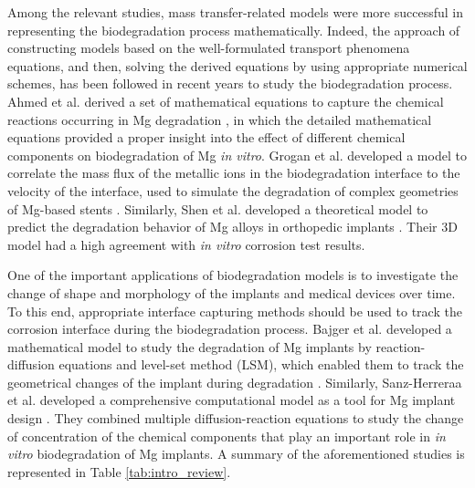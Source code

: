 Among the relevant studies, mass transfer-related models were more successful in representing the biodegradation process mathematically. Indeed, the approach of constructing models based on the well-formulated transport phenomena equations, and then, solving the derived equations by using appropriate numerical schemes, has been followed in recent years to study the biodegradation process. Ahmed et al. derived a set of mathematical equations to capture the chemical reactions occurring in Mg degradation \cite{Ahmed2017}, in which the detailed mathematical equations provided a proper insight into the effect of different chemical components on biodegradation of Mg \textit{in vitro}. Grogan et al. developed a model to correlate the mass flux of the metallic ions in the biodegradation interface to the velocity of the interface, used to simulate the degradation of complex geometries of Mg-based stents \cite{Grogan2014}. Similarly, Shen et al. developed a theoretical model to predict the degradation behavior of Mg alloys in orthopedic implants \cite{Shen2019}. Their 3D model had a high agreement with \textit{in vitro} corrosion test results.

One of the important applications of biodegradation models is to investigate the change of shape and morphology of the implants and medical devices over time. To this end, appropriate interface capturing methods should be used to track the corrosion interface during the biodegradation process. Bajger et al. developed a mathematical model to study the degradation of Mg implants by reaction-diffusion equations and level-set method (LSM), which enabled them to track the geometrical changes of the implant during degradation \cite{Bajger2016}. Similarly, Sanz-Herreraa et al. developed a comprehensive computational model as a tool for Mg implant design \cite{Sanz-Herrera2018}. They combined multiple diffusion-reaction equations to study the change of concentration of the chemical components that play an important role in \textit{in vitro} biodegradation of Mg implants. A summary of the aforementioned studies is represented in Table \ref{tab:intro_review}. 

